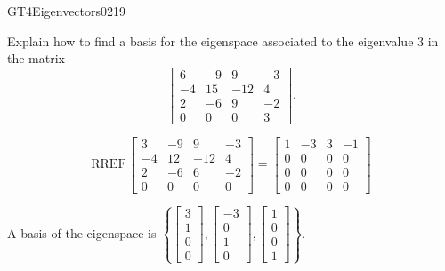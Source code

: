\begin{exercise}{GT4}{Eigenvectors}{0219} 
\begin{exerciseStatement} 

Explain how to find a basis for the eigenspace associated to the eigenvalue \(3\) in the matrix \[\left[\begin{array}{cccc}
6 & -9 & 9 & -3 \\
-4 & 15 & -12 & 4 \\
2 & -6 & 9 & -2 \\
0 & 0 & 0 & 3
\end{array}\right].\]

 \end{exerciseStatement}
 \begin{exerciseAnswer} 

\[\mathrm{RREF}\,\left[\begin{array}{cccc}
3 & -9 & 9 & -3 \\
-4 & 12 & -12 & 4 \\
2 & -6 & 6 & -2 \\
0 & 0 & 0 & 0
\end{array}\right]=\left[\begin{array}{cccc}
1 & -3 & 3 & -1 \\
0 & 0 & 0 & 0 \\
0 & 0 & 0 & 0 \\
0 & 0 & 0 & 0
\end{array}\right]\]

 

A basis of the eigenspace is \(\left\{ \left[\begin{array}{c}
3 \\
1 \\
0 \\
0
\end{array}\right] , \left[\begin{array}{c}
-3 \\
0 \\
1 \\
0
\end{array}\right] , \left[\begin{array}{c}
1 \\
0 \\
0 \\
1
\end{array}\right] \right\}\).

 \end{exerciseAnswer}
 \end{exercise}



